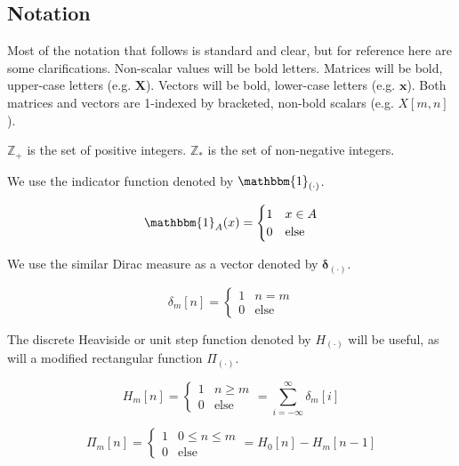 \documentclass{article}
\begin{document}
\setcounter{subsection}{-1}

\subsection{Notation}

Most of the notation that follows is standard and clear, but for reference here are some clarifications. Non-scalar values will be bold letters. Matrices will be bold, upper-case letters (e.g. $\bm{X}$). Vectors will be bold, lower-case letters (e.g. $\bm{x}$). Both matrices and vectors are 1-indexed by bracketed, non-bold scalars (e.g. $X[m, n]$).

$\mathbb{Z}_{+}$ is the set of positive integers. $\mathbb{Z}_{*}$ is the set of non-negative integers.

We use the indicator function denoted by $\mathbbm{1}_{(\cdot)}$.

\begin{equation}
    \mathbbm{1}_{A}(x) = \begin{cases} 
      1 & x\in A \\
      0 & \text{else}
   \end{cases}
\end{equation} 

We use the similar Dirac measure as a vector denoted by $\bm{\delta_{(\cdot)}}$.

\begin{equation}
    \delta_m[n] = \begin{cases} 
      1 & n=m \\
      0 & \text{else}
   \end{cases}
\end{equation} 

The discrete Heaviside or unit step function denoted by $H_{(\cdot)}$ will be useful, as will a modified rectangular function $\Pi_{(\cdot)}$.

\begin{equation}
    H_m[n] = \begin{cases} 
      1 & n\geq m \\
      0 & \text{else}
   \end{cases} = \sum_{i = -\infty}^{\infty} \delta_m[i]
\end{equation} 

\begin{equation}
    \Pi_m[n] = \begin{cases} 
      1 & 0\leq n \leq m \\
      0 & \text{else}
   \end{cases} = H_0[n] - H_m[n - 1]
\end{equation} 
\end{document}
